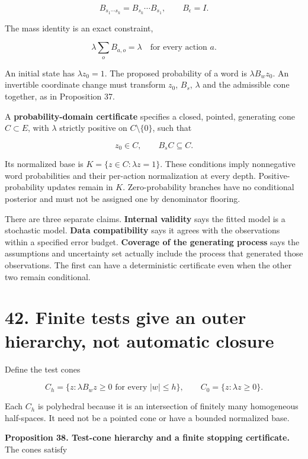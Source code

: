 \documentclass[11pt,letterpaper]{article}
\begin{document}
\[
B_{s_1\cdots s_k}=B_{s_k}\cdots B_{s_1},\qquad B_\epsilon=I.
\]

The mass identity is an exact constraint,

\[
\lambda\sum_o B_{a,o}=\lambda \quad\text{for every action }a.
\]

An initial state has \(\lambda z_0=1\). The proposed probability of a
word is \(\lambda B_wz_0\). An invertible coordinate change must
transform \(z_0\), \(B_s\), \(\lambda\) and the admissible cone
together, as in Proposition 37.

A \textbf{probability-domain certificate} specifies a closed, pointed,
generating cone \(C\subset E\), with \(\lambda\) strictly positive on
\(C\setminus\{0\}\), such that

\[
z_0\in C,\qquad B_sC\subseteq C.
\]

Its normalized base is \(K=\{z\in C:\lambda z=1\}\). These conditions
imply nonnegative word probabilities and their per-action normalization
at every depth. Positive-probability updates remain in \(K\).
Zero-probability branches have no conditional posterior and must not be
assigned one by denominator flooring.

There are three separate claims. \textbf{Internal validity} says the
fitted model is a stochastic model. \textbf{Data compatibility} says it
agrees with the observations within a specified error budget.
\textbf{Coverage of the generating process} says the assumptions and
uncertainty set actually include the process that generated those
observations. The first can have a deterministic certificate even when
the other two remain conditional.

\section{42. Finite tests give an outer hierarchy, not automatic
closure}\label{finite-tests-give-an-outer-hierarchy-not-automatic-closure}

Define the test cones

\[
C_h=\{z:\lambda B_wz\geq0\text{ for every }|w|\leq h\},
\qquad C_0=\{z:\lambda z\geq0\}.
\]

Each \(C_h\) is polyhedral because it is an intersection of finitely
many homogeneous half-spaces. It need not be a pointed cone or have a
bounded normalized base.

\textbf{Proposition 38. Test-cone hierarchy and a finite stopping
certificate.} The cones satisfy
\end{document}
